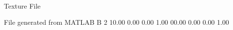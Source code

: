 Texture File

File generated from MATLAB
B 2
   10.00   0.00   0.00   1.00
   00.00   0.00   0.00   1.00
